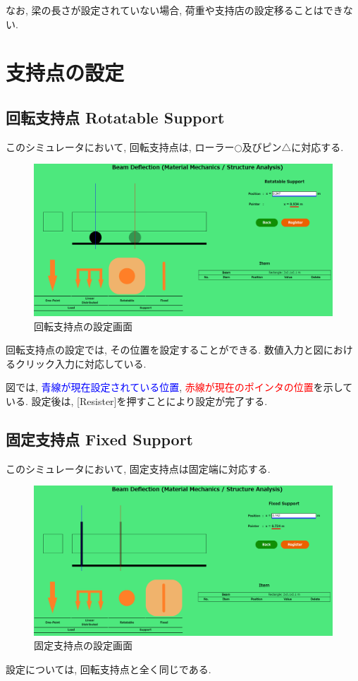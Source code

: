 \documentclass{jsarticle}
\begin{document}
なお, 梁の長さが設定されていない場合, 荷重や支持店の設定移ることはできない.


\newpage
\section{支持点の設定}
\subsection{回転支持点 Rotatable Support}
このシミュレータにおいて, 回転支持点は, ローラー$\bigcirc$及びピン$\bigtriangleup$に対応する.
\begin{figure}[H]
\begin{center}
\includegraphics[width=15cm]{Rotatable_Support_Setting.png}
\caption{回転支持点の設定画面}
\end{center}
\end{figure}
回転支持点の設定では, その位置を設定することができる. 数値入力と図におけるクリック入力に対応している. 

図では, \textcolor{blue}{青線が現在設定されている位置}, \textcolor{red}{赤線が現在のポインタの位置}を示している. 設定後は, [Resister]を押すことにより設定が完了する.

\newpage
\subsection{固定支持点 Fixed Support}
このシミュレータにおいて, 固定支持点は固定端に対応する.
\begin{figure}[H]
\begin{center}
\includegraphics[width=15cm]{Fixed_Support_Setting.png}
\caption{固定支持点の設定画面}
\end{center}
\end{figure}
設定については, 回転支持点と全く同じである.
\end{document}
